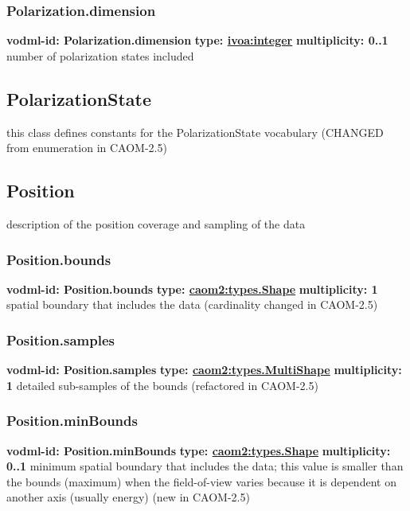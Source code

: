     \subsubsection{Polarization.dimension}
      \textbf{vodml-id: Polarization.dimension} \newline
      \textbf{type: \hyperref[sect:ivoa]{ivoa:integer}} \newline
      \textbf{multiplicity: 0..1} \newline
      number of polarization states included

  \subsection{PolarizationState}
  \label{sect:PolarizationState}
    this class defines constants for the PolarizationState vocabulary (CHANGED from enumeration in CAOM-2.5)

  \subsection{Position}
  \label{sect:Position}
    description of the position coverage and sampling of the data

    \subsubsection{Position.bounds}
      \textbf{vodml-id: Position.bounds} \newline
      \textbf{type: \hyperref[sect:types.Shape]{caom2:types.Shape}} \newline
      \textbf{multiplicity: 1} \newline
      spatial boundary that includes the data (cardinality changed in CAOM-2.5)

    \subsubsection{Position.samples}
      \textbf{vodml-id: Position.samples} \newline
      \textbf{type: \hyperref[sect:types.MultiShape]{caom2:types.MultiShape}} \newline
      \textbf{multiplicity: 1} \newline
      detailed sub-samples of the bounds (refactored in CAOM-2.5)

    \subsubsection{Position.minBounds}
      \textbf{vodml-id: Position.minBounds} \newline
      \textbf{type: \hyperref[sect:types.Shape]{caom2:types.Shape}} \newline
      \textbf{multiplicity: 0..1} \newline
      minimum spatial boundary that includes the data; this value is smaller than the bounds (maximum) when the field-of-view varies because it is dependent on another axis (usually energy) (new in CAOM-2.5)

